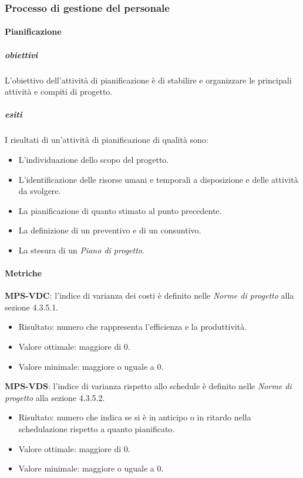 \documentclass[../piano-di-qualifica.tex]{subfiles}
\begin{document}
\subsubsection{Processo di gestione del personale}%
\label{subs:processo_di_gestione_del_personale}

\paragraph{Pianificazione}%
\label{par:pianificazione}

\subparagraph{obiettivi}%
\label{subp:obiettivi}
L'obiettivo dell'attività di pianificazione è di stabilire e organizzare le principali attività e compiti di progetto.

\subparagraph{esiti}%
\label{subp:esiti}
I risultati di un'attività di pianificazione di qualità sono:
\begin{itemize}
  \item L'individuazione dello scopo del progetto.
  \item L'identificazione delle risorse umani e temporali a disposizione e delle attività da svolgere.
  \item La pianificazione di quanto stimato al punto precedente.
  \item La definizione di un preventivo e di un consuntivo.
  \item La stesura di un \textit{Piano di progetto}.
\end{itemize}

\paragraph{Metriche}%
\label{par:metriche}

\textbf{MPS-VDC}: l'indice di varianza dei costi è definito nelle \textit{Norme di progetto} alla sezione 4.3.5.1.
\begin{itemize}
  \item Risultato: numero che rappresenta l'efficienza e la produttività.
  \item Valore ottimale: maggiore di 0.
  \item Valore minimale: maggiore o uguale a 0.
\end{itemize}

\textbf{MPS-VDS}: l'indice di varianza rispetto allo schedule è definito nelle \textit{Norme di progetto} alla sezione 4.3.5.2.
\begin{itemize}
  \item Risultato: numero che indica se si è in anticipo o in ritardo nella schedulazione rispetto a quanto pianificato.
  \item Valore ottimale: maggiore di 0.
  \item Valore minimale: maggiore o uguale a 0.
\end{itemize}
\end{document}
